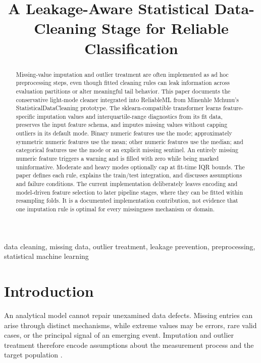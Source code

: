 \documentclass[conference]{IEEEtran}
\title{A Leakage-Aware Statistical Data-Cleaning Stage for Reliable Classification}
\author{
\jabulaniauthor
\and
\martinchanzauthor
\and
\oloratoauthor
\and
\mfundoauthor
\and
\minenhleauthor
}
\begin{document}
\maketitle

\begin{abstract}
Missing-value imputation and outlier treatment are often implemented as ad hoc preprocessing steps, even though fitted cleaning rules can leak information across evaluation partitions or alter meaningful tail behavior. This paper documents the conservative light-mode cleaner integrated into ReliableML from Minenhle Mchunu's StatisticalDataCleaning prototype. The sklearn-compatible transformer learns feature-specific imputation values and interquartile-range diagnostics from its fit data, preserves the input feature schema, and imputes missing values without capping outliers in its default mode. Binary numeric features use the mode; approximately symmetric numeric features use the mean; other numeric features use the median; and categorical features use the mode or an explicit missing sentinel. An entirely missing numeric feature triggers a warning and is filled with zero while being marked uninformative. Moderate and heavy modes optionally cap at fit-time IQR bounds. The paper defines each rule, explains the train/test integration, and discusses assumptions and failure conditions. The current implementation deliberately leaves encoding and model-driven feature selection to later pipeline stages, where they can be fitted within resampling folds. It is a documented implementation contribution, not evidence that one imputation rule is optimal for every missingness mechanism or domain.
\end{abstract}

\begin{IEEEkeywords}
data cleaning, missing data, outlier treatment, leakage prevention, preprocessing, statistical machine learning
\end{IEEEkeywords}

\section{Introduction}
An analytical model cannot repair unexamined data defects. Missing entries can arise through distinct mechanisms, while extreme values may be errors, rare valid cases, or the principal signal of an emerging event. Imputation and outlier treatment therefore encode assumptions about the measurement process and the target population \cite{rubin1976,little2002,tukey1977}.
\end{document}
